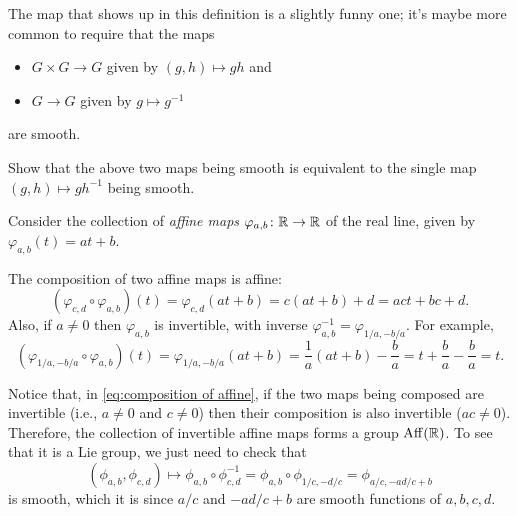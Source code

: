 The map that shows up in this definition is a slightly funny one; it's maybe more common to require that the maps
\begin{itemize}
	\item $G \times G \to G$ given by $(g,h) \mapsto gh$ and
	\item $G \to G$ given by $g \mapsto g^{-1}$
\end{itemize}
are smooth. 

\begin{exercise}
	Show that the above two maps being smooth is equivalent to the single map $(g,h) \mapsto gh^{-1}$ being smooth. 
\end{exercise}

\begin{example}\label{ex:affine group}
	Consider the collection of \emph{affine maps} $\varphi_{a,b} \colon\thinspace\! \mathbb{R} \to \mathbb{R}$ of the real line, given by $\varphi_{a,b}(t) = at + b$. 
	
	The composition of two affine maps is affine:
	\begin{equation}\label{eq:composition of affine}
		(\varphi_{c,d} \circ \varphi_{a,b})(t) = \varphi_{c,d}(at+b) = c(at+b)+d = act + bc+d.
	\end{equation}
	Also, if $a \neq 0$ then $\varphi_{a,b}$ is invertible, with inverse $\varphi_{a,b}^{-1} = \varphi_{1/a,-b/a}$. For example,
	\[
		(\varphi_{1/a,-b/a}\circ\varphi_{a,b})(t) = \varphi_{1/a,-b/a}(at+b) = \frac{1}{a}(at+b) - \frac{b}{a} = t + \frac{b}{a} - \frac{b}{a} = t.
	\]
	
	Notice that, in \eqref{eq:composition of affine}, if the two maps being composed are invertible (i.e., $a \neq 0$ and $c \neq 0$) then their composition is also invertible ($ac \neq 0$). Therefore, the collection of invertible affine maps forms a group $\operatorname{Aff}(\mathbb{R})$. To see that it is a Lie group, we just need to check that
	\[
		(\phi_{a,b}, \phi_{c,d}) \mapsto \phi_{a,b} \circ \phi_{c,d}^{-1} = \phi_{a,b} \circ \phi_{1/c,-d/c} = \phi_{a/c,-ad/c+b}
	\]
	is smooth, which it is since $a/c$ and $-ad/c+b$ are smooth functions of $a,b,c,d$.
	

\end{example}
